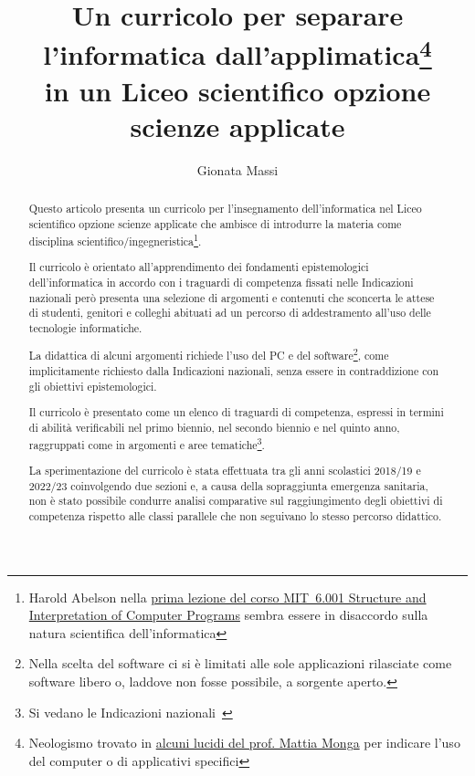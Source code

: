 \documentclass[a4paper]{easychair}
\title{Un curricolo per separare l'informatica dall'applimatica\thanks{Neologismo %
trovato in \href{https://aladdin.unimi.it/materiali/talk/2012_mirabilandia.pdf}%
{alcuni lucidi del prof. Mattia Monga} per indicare l'uso del computer o di applicativi specifici}\\ in un %
Liceo scientifico opzione scienze applicate}
\author{
Gionata Massi\institute{
  IIS Savoia Benincasa, Ancona (AN)
 }
}
\institute{
  IIS Savoia Benincasa, Ancona (AN)\\
  \email{gionata.massi@savoiabenincasa.it}
}
\begin{document}
\maketitle

\begin{abstract}
Questo articolo presenta un curricolo per l'insegnamento dell'informatica
nel Liceo scientifico opzione scienze applicate che ambisce di introdurre
la materia come disciplina scientifico/ingegneristica\footnote{Harold Abelson nella
\href{https://youtu.be/-J_xL4IGhJA}{prima lezione del corso MIT~6.001
Structure and Interpretation of Computer Programs}
sembra essere in disaccordo sulla natura scientifica dell'informatica
}.

Il curricolo è orientato all'apprendimento dei fondamenti epistemologici
dell'informatica in accordo con i traguardi di competenza fissati 
nelle Indicazioni nazionali però presenta una selezione di argomenti e contenuti
che sconcerta le attese di studenti, genitori e colleghi abituati ad un
percorso di addestramento all'uso delle tecnologie informatiche.

La didattica di alcuni argomenti richiede l'uso del PC e
del software\footnote{Nella scelta del software ci si è limitati
alle sole applicazioni rilasciate come software libero o, laddove non fosse
possibile, a sorgente aperto.}, come implicitamente richiesto dalla Indicazioni nazionali,
senza essere in contraddizione con gli obiettivi epistemologici.

Il curricolo è presentato come un elenco di traguardi di competenza, espressi in termini di abilità verificabili
nel primo biennio, nel secondo biennio e nel quinto anno, raggruppati come in argomenti e
aree tematiche\footnote{Si vedano le Indicazioni nazionali~\cite{IlMinistro2010}}.

La sperimentazione del curricolo è stata effettuata tra gli anni scolastici
2018/19 e 2022/23 coinvolgendo due sezioni e, 
a causa della sopraggiunta emergenza sanitaria, non è stato possibile condurre analisi
comparative sul raggiungimento degli obiettivi di competenza rispetto alle
classi parallele che non seguivano lo stesso percorso didattico.


\end{abstract}
\end{document}
